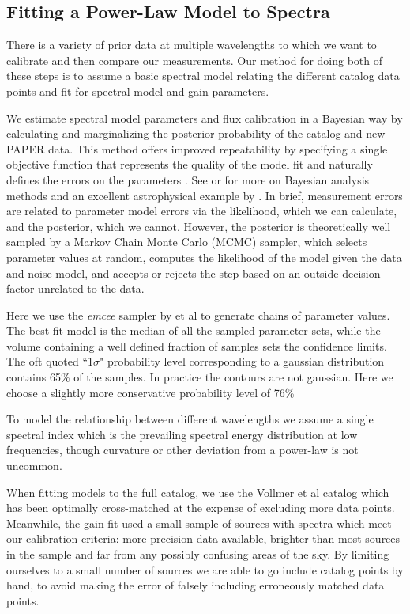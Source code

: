 \documentclass[preprint]{aastex}
\begin{document}
\subsection{Fitting a Power-Law Model to Spectra}
\label{sec:mcmc}

There is a variety of prior data at multiple wavelengths to which we want to calibrate
and then compare our measurements.  Our method for doing both of these steps
is to assume a basic spectral model relating the different catalog data points and
fit for spectral model and gain parameters. 

We estimate spectral model parameters and flux calibration in a
Bayesian way by calculating and marginalizing the posterior probability of the
catalog and new PAPER data.   This method
offers improved repeatability by specifying a single objective function that
represents the quality of the model fit and naturally defines the errors on the
parameters \citep{Hogg:2010p8759}.   See  \citet{Mackay:2003p9717}  or
\citet{Sivia:2006p9736} for more on Bayesian analysis methods and an excellent
astrophysical example by \cite{Press:1997p9783}. In brief, measurement errors
are related to parameter model errors via the likelihood, which we can calculate, 
and the posterior, which we cannot.  However, the posterior is theoretically
well sampled by a Markov Chain Monte Carlo (MCMC) sampler, which selects parameter
values at random, computes the likelihood of the model given the data and noise model,
and accepts or rejects the step based on an outside decision factor unrelated to the data.


Here we use the \emph{emcee} sampler by \citet{Mackay:2003p9717} et al to generate chains of
parameter values. The best fit model is the median of all the sampled
parameter sets, while the volume containing a well defined fraction of samples
sets the confidence limits.  The oft quoted ``1$\sigma$" probability level
corresponding to a gaussian distribution contains 65\% of the samples. In
practice the contours are not gaussian. Here we choose a slightly more
conservative probability level of 76\% 


To model the relationship between different wavelengths we assume a single spectral index
which is the prevailing spectral energy distribution at low frequencies, 
though curvature or other
deviation from a power-law is not uncommon.  

When fitting models to the full catalog, we use the Vollmer et al
catalog which has been optimally cross-matched at the expense of excluding more data points.
Meanwhile, the gain fit used a small sample of
sources with spectra which meet our calibration criteria: more precision data available,
brighter than most sources in the sample and far from any possibly confusing areas of
the sky. 
By limiting ourselves to a small number of sources we are able to go include catalog points by hand,
to avoid making the error of falsely including erroneously matched 
data points.
\end{document}

